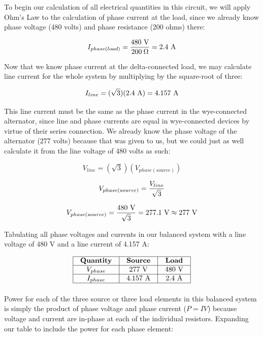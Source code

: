 To begin our calculation of all electrical quantities in this circuit, we will apply Ohm's Law to the calculation of phase current at the load, since we already know phase voltage (480 volts) and phase resistance (200 ohms) there:

$$I_{phase(load)} = {480 \hbox{ V} \over 200 \> \Omega} = 2.4 \hbox{ A}$$

Now that we know phase current at the delta-connected load, we may calculate line current for the whole system by multiplying by the square-root of three:

$$I_{line} = (\sqrt{3})(2.4 \hbox{ A}) = 4.157 \hbox{ A}$$

This line current must be the same as the phase current in the wye-connected alternator, since line and phase currents are equal in wye-connected devices by virtue of their series connection.  We already know the phase voltage of the alternator (277 volts) because that was given to us, but we could just as well calculate it from the line voltage of 480 volts as such:

$$V_{line} = (\sqrt{3})(V_{phase(source)})$$

$$V_{phase(source)} = {V_{line} \over \sqrt{3}}$$

$$V_{phase(source)} = {480 \hbox{ V} \over \sqrt{3}} = 277.1 \hbox{ V} \approx 277 \hbox{ V}$$

Tabulating all phase voltages and currents in our balanced system with a line voltage of 480 V and a line current of 4.157 A:


$$\vbox{\offinterlineskip
\halign{\strut
\vrule \quad\hfil # \ \hfil & 
\vrule \quad\hfil # \ \hfil & 
\vrule \quad\hfil # \ \hfil \vrule \cr
\noalign{\hrule}
%
\textbf{Quantity} & \textbf{Source} & \textbf{Load} \cr
%
\noalign{\hrule}
%
$V_{phase}$ & 277 V & 480 V \cr
%
\noalign{\hrule}
%
$I_{phase}$ & 4.157 A & 2.4 A \cr
%
\noalign{\hrule}
} %
}$$ %

\filbreak

Power for each of the three source or three load elements in this balanced system is simply the product of phase voltage and phase current ($P = IV$) because voltage and current are in-phase at each of the individual resistors.  Expanding our table to include the power for each phase element:


